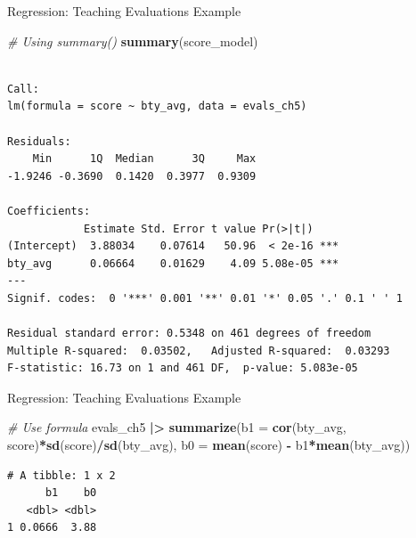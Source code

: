 \documentclass[
  ignorenonframetext,
]{beamer}
\newenvironment{Shaded}{\begin{snugshade}}{\end{snugshade}}
\newcommand{\AttributeTok}[1]{\textcolor[rgb]{0.13,0.29,0.53}{#1}}
\newcommand{\CommentTok}[1]{\textcolor[rgb]{0.56,0.35,0.01}{\textit{#1}}}
\newcommand{\FunctionTok}[1]{\textcolor[rgb]{0.13,0.29,0.53}{\textbf{#1}}}
\newcommand{\NormalTok}[1]{#1}
\newcommand{\SpecialCharTok}[1]{\textcolor[rgb]{0.81,0.36,0.00}{\textbf{#1}}}
\begin{document}
\begin{frame}[fragile]{Regression: Teaching Evaluations Example}
\label{regression-teaching-evaluations-example-3}
\small

\begin{Shaded}
\begin{Highlighting}[]
\CommentTok{\# Using summary()}
\FunctionTok{summary}\NormalTok{(score\_model)}
\end{Highlighting}
\end{Shaded}

\begin{verbatim}

Call:
lm(formula = score ~ bty_avg, data = evals_ch5)

Residuals:
    Min      1Q  Median      3Q     Max 
-1.9246 -0.3690  0.1420  0.3977  0.9309 

Coefficients:
            Estimate Std. Error t value Pr(>|t|)    
(Intercept)  3.88034    0.07614   50.96  < 2e-16 ***
bty_avg      0.06664    0.01629    4.09 5.08e-05 ***
---
Signif. codes:  0 '***' 0.001 '**' 0.01 '*' 0.05 '.' 0.1 ' ' 1

Residual standard error: 0.5348 on 461 degrees of freedom
Multiple R-squared:  0.03502,   Adjusted R-squared:  0.03293 
F-statistic: 16.73 on 1 and 461 DF,  p-value: 5.083e-05
\end{verbatim}
\end{frame}

\begin{frame}[fragile]{Regression: Teaching Evaluations Example}
\label{regression-teaching-evaluations-example-4}
\small

\begin{Shaded}
\begin{Highlighting}[]
\CommentTok{\# Use formula}
\NormalTok{evals\_ch5 }\SpecialCharTok{|\textgreater{}} 
  \FunctionTok{summarize}\NormalTok{(}\AttributeTok{b1 =} \FunctionTok{cor}\NormalTok{(bty\_avg, score)}\SpecialCharTok{*}\FunctionTok{sd}\NormalTok{(score)}\SpecialCharTok{/}\FunctionTok{sd}\NormalTok{(bty\_avg),}
            \AttributeTok{b0 =} \FunctionTok{mean}\NormalTok{(score) }\SpecialCharTok{{-}}\NormalTok{ b1}\SpecialCharTok{*}\FunctionTok{mean}\NormalTok{(bty\_avg))}
\end{Highlighting}
\end{Shaded}

\begin{verbatim}
# A tibble: 1 x 2
      b1    b0
   <dbl> <dbl>
1 0.0666  3.88
\end{verbatim}
\end{frame}
\end{document}

